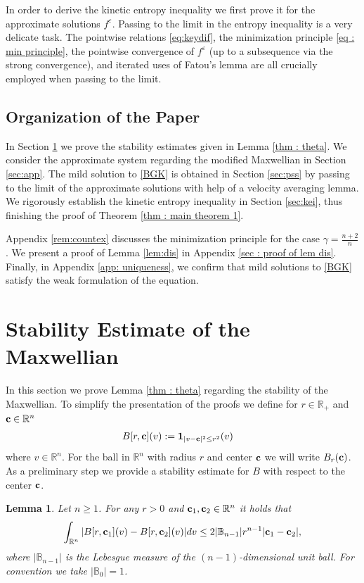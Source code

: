 \documentclass{amsart}
\theoremstyle{plain}
\newtheorem{lemma}[theorem]{Lemma}
\theoremstyle{remark}
\numberwithin{equation}{section}
\newcommand{\bfc}{{\bf c}}
\newcommand{\bbB}{\mathbb B}
\newcommand{\R}{\mathbb{R}}
\newcommand{\ve}{\varepsilon}
\newcommand{\dv}{\textnormal{d}v}
\begin{document}
   In order to derive the kinetic entropy inequality we first prove it for the approximate solutions $f^\ve$.
   Passing to the limit in the entropy inequality is a very delicate task. The pointwise relations \eqref{eq:keydif}, the minimization principle \eqref{eq : min principle}, the pointwise convergence of $f^\ve$ (up to a subsequence via the strong convergence), and iterated uses of Fatou's lemma are all crucially employed when passing to the limit.

    
   

\subsection{Organization of the Paper}

In Section \ref{sec:sta} we prove the stability estimates given in Lemma \ref{thm : theta}. We consider the approximate system regarding the modified Maxwellian in Section \ref{sec:app}. The mild solution to \eqref{BGK} is obtained in Section \ref{sec:pss} by passing to the limit of the approximate solutions with help of a velocity averaging lemma. We rigorously establish the kinetic entropy inequality in Section \ref{sec:kei}, thus finishing the proof of Theorem \ref{thm : main theorem 1}.

Appendix \ref{rem:countex} discusses the minimization principle for the case $\gamma=\frac{n+2}{n}$. We present a proof of Lemma \ref{lem:dis} in Appendix \ref{sec : proof of lem dis}. Finally, in Appendix \ref{app: uniqueness}, we confirm that mild solutions to \eqref{BGK} satisfy the weak formulation of the equation. 

\section{Stability Estimate of the Maxwellian}\label{sec:sta}
In this section we prove Lemma \ref{thm : theta} regarding the stability of the Maxwellian. To simplify the presentation of the proofs we define for $r\in\R_+$ and $\bfc \in \R^n$
\begin{align*}
    &B[r,\bfc](v) := \mathbf{1}_{|v-\bfc|^2 \le r^2}(v)
\end{align*}
where $v \in \R^n$. For the ball in $\R^n$ with radius $r$ and center $\bfc$ we will write $B_r(\bfc)$. As a preliminary step we provide a stability estimate for $B$ with respect to the center $\bfc$.
\begin{lemma}
\label{lem : 2.1}
    Let $n\ge1$. For any $r >0$ and $\bfc_1,\bfc_2\in \R^n$ it holds that
\begin{align*}
  \int_{\R^n} |B[r,\bfc_1](v) - B[r,\bfc_2](v)| \dv \le  2|\bbB_{n-1}| r^{n-1}|\bfc_1-\bfc_2|,
\end{align*}
where $|\bbB_{n-1}|$ is the Lebesgue measure of the $(n-1)$-dimensional unit ball. For convention we take $|\bbB_0|=1$.
\end{lemma}
\end{document}
